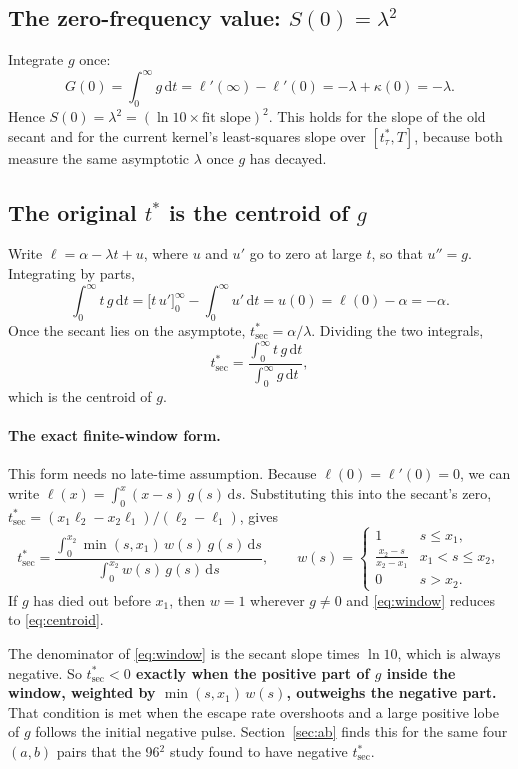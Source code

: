\documentclass[11pt]{article}
\newcommand{\tsec}{t^*_{\mathrm{sec}}}
\newcommand{\ttau}{t^*_{\tau}}
\newcommand{\dd}{\mathrm{d}}
\begin{document}
\subsection{The zero-frequency value: $S(0)=\lambda^2$}
Integrate $g$ once:
\[
  G(0)=\int_0^\infty g\,\dd t=\ell'(\infty)-\ell'(0)=-\lambda+\kappa(0)=-\lambda .
\]
Hence $S(0)=\lambda^2=(\ln 10\times\text{fit slope})^2$. This holds for the slope
of the old secant and for the current kernel's least-squares slope over
$[\ttau,T]$, because both measure the same asymptotic $\lambda$ once $g$ has
decayed.

\subsection{The original $t^*$ is the centroid of $g$}
Write $\ell=\alpha-\lambda t+u$, where $u$ and $u'$ go to zero at large $t$, so
that $u''=g$. Integrating by parts,
\[
  \int_0^\infty t\,g\,\dd t=\big[t\,u'\big]_0^\infty-\int_0^\infty u'\,\dd t=u(0)=\ell(0)-\alpha=-\alpha .
\]
Once the secant lies on the asymptote, $\tsec=\alpha/\lambda$. Dividing the two
integrals,
\begin{equation}
  \tsec=\frac{\int_0^\infty t\,g\,\dd t}{\int_0^\infty g\,\dd t},
  \label{eq:centroid}
\end{equation}
which is the centroid of $g$.

\paragraph{The exact finite-window form.}
This form needs no late-time assumption. Because $\ell(0)=\ell'(0)=0$, we can
write $\ell(x)=\int_0^x(x-s)\,g(s)\,\dd s$. Substituting this into the secant's
zero, $\tsec=(x_1\ell_2-x_2\ell_1)/(\ell_2-\ell_1)$, gives
\begin{equation}
  \tsec=\frac{\int_0^{x_2}\min(s,x_1)\,w(s)\,g(s)\,\dd s}{\int_0^{x_2}w(s)\,g(s)\,\dd s},
  \qquad
  w(s)=\begin{cases}1 & s\le x_1,\\ \frac{x_2-s}{x_2-x_1} & x_1<s\le x_2,\\ 0 & s>x_2.\end{cases}
  \label{eq:window}
\end{equation}
If $g$ has died out before $x_1$, then $w=1$ wherever $g\neq0$ and
\eqref{eq:window} reduces to \eqref{eq:centroid}.

The denominator of \eqref{eq:window} is the secant slope times $\ln 10$, which is
always negative. So \textbf{$\tsec<0$ exactly when the positive part of $g$
inside the window, weighted by $\min(s,x_1)\,w(s)$, outweighs the negative
part.} That condition is met when the escape rate overshoots and a large positive
lobe of $g$ follows the initial negative pulse. Section~\ref{sec:ab} finds this
for the same four $(a,b)$ pairs that the 96$^2$ study found to have negative
$\tsec$.
\end{document}
